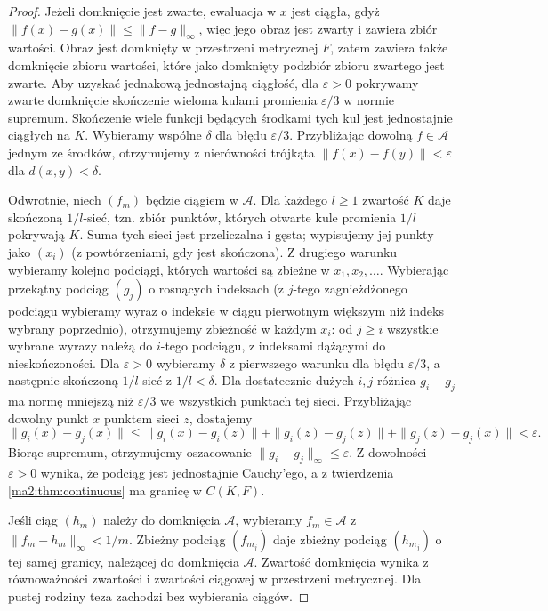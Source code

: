 \begin{proof}
Jeżeli domknięcie jest zwarte, ewaluacja w $x$
jest ciągła, gdyż
$\|f(x)-g(x)\|\le\|f-g\|_\infty$,
więc jego obraz jest zwarty
i zawiera zbiór wartości. Obraz jest domknięty
w przestrzeni metrycznej $F$, zatem zawiera
także domknięcie zbioru wartości, które jako
domknięty podzbiór zbioru zwartego jest zwarte.
Aby uzyskać
jednakową jednostajną ciągłość, dla
$\varepsilon>0$ pokrywamy zwarte domknięcie
skończenie wieloma kulami promienia
$\varepsilon/3$ w normie supremum.
Skończenie wiele funkcji będących środkami
tych kul jest jednostajnie ciągłych na $K$.
Wybieramy wspólne $\delta$ dla błędu
$\varepsilon/3$. Przybliżając dowolną
$f\in\mathcal A$ jednym ze środków,
otrzymujemy z nierówności trójkąta
$\|f(x)-f(y)\|<\varepsilon$ dla $d(x,y)<\delta$.

Odwrotnie, niech $(f_m)$ będzie ciągiem
w $\mathcal A$. Dla każdego $l\ge1$ zwartość
$K$ daje skończoną $1/l$-sieć, tzn. zbiór
punktów, których otwarte kule promienia $1/l$
pokrywają $K$. Suma tych sieci jest przeliczalna
i gęsta; wypisujemy jej punkty jako $(x_i)$
(z powtórzeniami, gdy jest skończona).
Z drugiego warunku wybieramy kolejno
podciągi, których wartości są zbieżne
w $x_1,x_2,\ldots$. Wybierając przekątny
podciąg $(g_j)$ o rosnących indeksach
(z $j$-tego zagnieżdżonego podciągu wybieramy
wyraz o indeksie w ciągu pierwotnym większym
niż indeks wybrany poprzednio), otrzymujemy
zbieżność w każdym $x_i$: od $j\ge i$
wszystkie wybrane wyrazy należą do $i$-tego
podciągu, z indeksami dążącymi do nieskończoności.
Dla $\varepsilon>0$ wybieramy $\delta$
z pierwszego warunku dla błędu
$\varepsilon/3$, a następnie skończoną
$1/l$-sieć z $1/l<\delta$.
Dla dostatecznie dużych $i,j$ różnica
$g_i-g_j$ ma normę mniejszą niż
$\varepsilon/3$ we wszystkich punktach
tej sieci. Przybliżając dowolny punkt $x$
punktem sieci $z$, dostajemy
\[
 \|g_i(x)-g_j(x)\|
 \le \|g_i(x)-g_i(z)\|+\|g_i(z)-g_j(z)\|
      +\|g_j(z)-g_j(x)\|<\varepsilon.
\]
Biorąc supremum, otrzymujemy oszacowanie
$\|g_i-g_j\|_\infty\le\varepsilon$.
Z dowolności $\varepsilon>0$ wynika, że
podciąg jest jednostajnie Cauchy'ego,
a z twierdzenia \ref{ma2:thm:continuous}
ma granicę w $C(K,F)$.

Jeśli ciąg $(h_m)$ należy do domknięcia
$\mathcal A$, wybieramy $f_m\in\mathcal A$
z $\|f_m-h_m\|_\infty<1/m$.
Zbieżny podciąg $(f_{m_j})$ daje zbieżny
podciąg $(h_{m_j})$ o tej samej granicy,
należącej do domknięcia $\mathcal A$.
Zwartość domknięcia wynika z równoważności
zwartości i zwartości ciągowej w przestrzeni
metrycznej. Dla pustej rodziny teza zachodzi
bez wybierania ciągów.
\end{proof}

